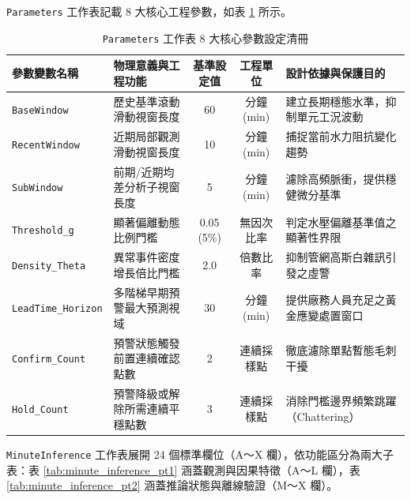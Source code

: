 \documentclass[fontset=none, a4paper, 12pt]{ctexart}
\begin{document}
\texttt{Parameters} 工作表記載 8 大核心工程參數，如表 \ref{tab:excel_parameters} 所示。
\begin{table}[H]
    \centering
    \caption{\texttt{Parameters} 工作表 8 大核心參數設定清冊}
    \label{tab:excel_parameters}
    \small
    \begin{tabularx}{\textwidth}{llccl}
        \toprule
        \textbf{參數變數名稱} & \textbf{物理意義與工程功能} & \textbf{基準設定值} & \textbf{工程單位} & \textbf{設計依據與保護目的} \\
        \midrule
        \texttt{BaseWindow} & 歷史基準滾動滑動視窗長度 & 60 & 分鐘 (min) & 建立長期穩態水準，抑制單元工況波動 \\
        \texttt{RecentWindow} & 近期局部觀測滑動視窗長度 & 10 & 分鐘 (min) & 捕捉當前水力阻抗變化趨勢 \\
        \texttt{SubWindow} & 前期/近期均差分析子視窗長度 & 5 & 分鐘 (min) & 濾除高頻脈衝，提供穩健微分基準 \\
        \texttt{Threshold\_g} & 顯著偏離動態比例門檻 & 0.05 (5\%) & 無因次比率 & 判定水壓偏離基準值之顯著性界限 \\
        \texttt{Density\_Theta} & 異常事件密度增長倍比門檻 & 2.0 & 倍數比率 & 抑制管網高斯白雜訊引發之虛警 \\
        \texttt{LeadTime\_Horizon} & 多階梯早期預警最大預測視域 & 30 & 分鐘 (min) & 提供廠務人員充足之黃金應變處置窗口 \\
        \texttt{Confirm\_Count} & 預警狀態觸發前置連續確認點數 & 2 & 連續採樣點 & 徹底濾除單點暫態毛刺干擾 \\
        \texttt{Hold\_Count} & 預警降級或解除所需連續平穩點數 & 3 & 連續採樣點 & 消除門檻邊界頻繁跳躍（Chattering） \\
        \bottomrule
    \end{tabularx}
\end{table}

\texttt{MinuteInference} 工作表展開 24 個標準欄位（A～X 欄），依功能區分為兩大子表：表 \ref{tab:minute_inference_pt1} 涵蓋觀測與因果特徵（A～L 欄），表 \ref{tab:minute_inference_pt2} 涵蓋推論狀態與離線驗證（M～X 欄）。
\end{document}
